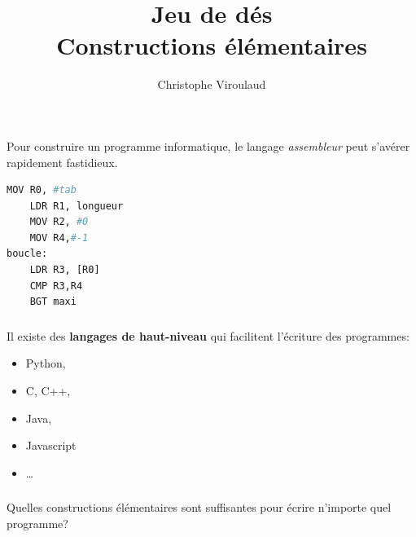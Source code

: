 \documentclass[svgnames,11pt]{beamer}
\author[]{Christophe Viroulaud}
\title{Jeu de dés\\ Constructions élémentaires}
\date{\framebox{\textbf{Lang 01}}}
\institute{Première - NSI}
\begin{document}
\begin{frame}
    \titlepage
\end{frame}
\begin{frame}[fragile]
    \frametitle{}
    Pour construire un programme informatique, le langage \emph{assembleur} peut s'avérer rapidement fastidieux.
    \begin{center}
        \begin{lstlisting}[language=Python , basicstyle=\ttfamily\small, xleftmargin=1em, xrightmargin=1em]
    MOV R0, #tab      
    LDR R1, longueur  
    MOV R2, #0   
    MOV R4,#-1 
boucle:
    LDR R3, [R0]      
    CMP R3,R4     
    BGT maxi
\end{lstlisting}
        \label{CODE}
    \end{center}
\end{frame}
\begin{frame}
    \frametitle{}

    Il existe des \textbf{langages de haut-niveau} qui facilitent l'écriture des programmes:
    \begin{itemize}
        \item Python,
        \item C, C++,
        \item Java,
        \item Javascript
        \item \dots
    \end{itemize}
\end{frame}
\begin{frame}
    \frametitle{}
    \begin{framed}
        \begin{center}
            Quelles constructions élémentaires sont suffisantes pour écrire n'importe quel programme?
        \end{center}
    \end{framed}
\end{frame}
\end{document}
